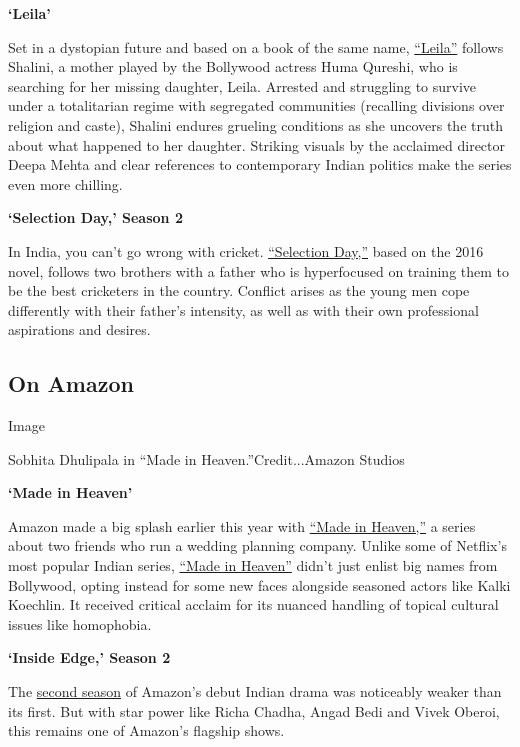 \textbf{`Leila'}

Set in a dystopian future and based on a book of the same name,
\href{https://www.youtube.com/watch?v=5yxjRgwYymg}{``Leila''} follows
Shalini, a mother played by the Bollywood actress Huma Qureshi, who is
searching for her missing daughter, Leila. Arrested and struggling to
survive under a totalitarian regime with segregated communities
(recalling divisions over religion and caste), Shalini endures grueling
conditions as she uncovers the truth about what happened to her
daughter. Striking visuals by the acclaimed director Deepa Mehta and
clear references to contemporary Indian politics make the series even
more chilling.

\textbf{`Selection Day,' Season 2}

In India, you can't go wrong with cricket.
\href{https://www.youtube.com/watch?v=5tpEXBy0R0A}{``Selection Day,''}
based on the 2016 novel, follows two brothers with a father who is
hyperfocused on training them to be the best cricketers in the country.
Conflict arises as the young men cope differently with their father's
intensity, as well as with their own professional aspirations and
desires.

\hypertarget{on-amazon}{%
\subsection{On Amazon}\label{on-amazon}}

Image

Sobhita Dhulipala in ``Made in Heaven.''Credit...Amazon Studios

\textbf{`Made in Heaven'}

Amazon made a big splash earlier this year with
\href{https://www.nytimes.com/2019/04/09/arts/television/amazon-india-made-in-heaven.html}{``Made
in Heaven,''} a series about two friends who run a wedding planning
company. Unlike some of Netflix's most popular Indian series,
\href{https://www.youtube.com/watch?v=Qyg9_a7avTI}{``Made in Heaven''}
didn't just enlist big names from Bollywood, opting instead for some new
faces alongside seasoned actors like Kalki Koechlin. It received
critical acclaim for its nuanced handling of topical cultural issues
like homophobia.

\textbf{`Inside Edge,' Season 2}

The \href{https://www.youtube.com/watch?v=es_cjyjeYbc}{second season} of
Amazon's debut Indian drama was noticeably weaker than its first. But
with star power like Richa Chadha, Angad Bedi and Vivek Oberoi, this
remains one of Amazon's flagship shows.

